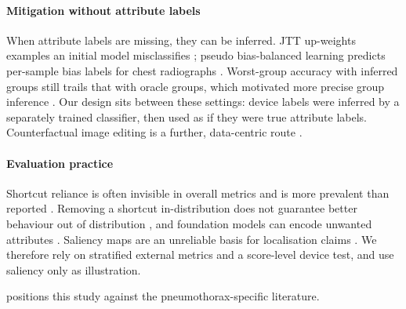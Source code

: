 \documentclass{ieeeaccess}
\begin{document}
\paragraph{Mitigation without attribute labels}
When attribute labels are missing, they can be inferred. JTT up-weights examples an initial model misclassifies \cite{liu2021jtt}; pseudo bias-balanced learning predicts per-sample bias labels for chest radiographs \cite{luo2022pbbl}. Worst-group accuracy with inferred groups still trails that with oracle groups, which motivated more precise group inference \cite{han2024gic}. Our design sits between these settings: device labels were inferred by a separately trained classifier, then used as if they were true attribute labels. Counterfactual image editing is a further, data-centric route \cite{cooke2026roentmod}.

\paragraph{Evaluation practice}
Shortcut reliance is often invisible in overall metrics and is more prevalent than reported \cite{unnikrishnan2024pest,vasquez2024cleverhans}. Removing a shortcut in-distribution does not guarantee better behaviour out of distribution \cite{yang2024limits}, and foundation models can encode unwanted attributes \cite{glocker2023foundation}. Saliency maps are an unreliable basis for localisation claims \cite{saporta2022saliency,arun2021saliency}. We therefore rely on stratified external metrics and a score-level device test, and use saliency only as illustration.

 positions this study against the pneumothorax-specific literature.
\end{document}
